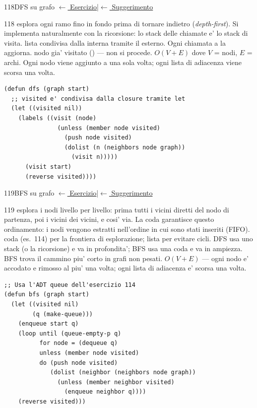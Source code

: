 \label{sol:118}
\begin{solbox}{118}{DFS su grafo}
\small\color{black!55}\hyperref[ex:118]{$\leftarrow$ Esercizio}\enspace\textcolor{black!30}{|}\enspace\hyperref[hint:118]{$\leftarrow$ Suggerimento}\normalsize\color{black}
\begin{ragionamentoBox}{118}
 esplora ogni ramo fino in fondo prima di tornare indietro
(\textit{depth-first}). Si implementa naturalmente con la ricorsione:
lo stack delle chiamate e' lo stack di visita.
 lista  condivisa dalla  interna
tramite il  esterno. Ogni chiamata a  la aggiorna.
 nodo gia' visitato () — non si procede.
 $O(V + E)$ dove $V$ = nodi, $E$ = archi.
Ogni nodo viene aggiunto a  una sola volta;
ogni lista di adiacenza viene scorsa una volta.
\end{ragionamentoBox}
\begin{lstlisting}
(defun dfs (graph start)
  ;; visited e' condivisa dalla closure tramite let
  (let ((visited nil))
    (labels ((visit (node)
               (unless (member node visited)
                 (push node visited)
                 (dolist (n (neighbors node graph))
                   (visit n)))))
      (visit start)
      (reverse visited))))
\end{lstlisting}
\end{solbox}

\label{sol:119}
\begin{solbox}{119}{BFS su grafo}
\small\color{black!55}\hyperref[ex:119]{$\leftarrow$ Esercizio}\enspace\textcolor{black!30}{|}\enspace\hyperref[hint:119]{$\leftarrow$ Suggerimento}\normalsize\color{black}
\begin{ragionamentoBox}{119}
 esplora i nodi livello per livello: prima tutti i vicini
diretti del nodo di partenza, poi i vicini dei vicini, e cosi' via.
La coda garantisce questo ordinamento: i nodi vengono estratti
nell'ordine in cui sono stati inseriti (FIFO).
 coda (es.~114) per la frontiera di esplorazione;
lista  per evitare cicli.
 DFS usa uno stack (o la ricorsione) e
va in profondita'; BFS usa una coda e va in ampiezza.
BFS trova il cammino piu' corto in grafi non pesati.
 $O(V + E)$ — ogni nodo e' accodato e rimosso al piu'
una volta; ogni lista di adiacenza e' scorsa una volta.
\end{ragionamentoBox}
\begin{lstlisting}
;; Usa l'ADT queue dell'esercizio 114
(defun bfs (graph start)
  (let ((visited nil)
        (q (make-queue)))
    (enqueue start q)
    (loop until (queue-empty-p q)
          for node = (dequeue q)
          unless (member node visited)
          do (push node visited)
             (dolist (neighbor (neighbors node graph))
               (unless (member neighbor visited)
                 (enqueue neighbor q))))
    (reverse visited)))
\end{lstlisting}
\end{solbox}

